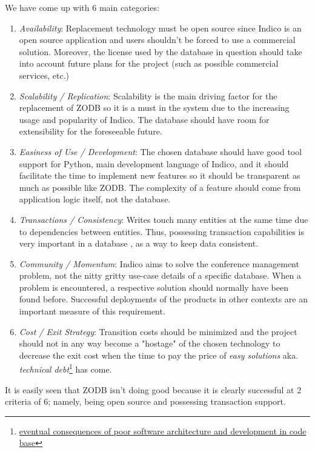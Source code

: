 We have come up with 6 main categories:

\begin{enumerate}
  \item \textit{Availability}: Replacement technology must be open source since Indico is an open source application and users shouldn't be forced to use a commercial solution. Moreover, the license used by the database in question should take into account future plans for the project (such as possible commercial services, etc.)
  \item \textit{Scalability / Replication}: Scalability is the main driving factor for the replacement of \textsc{ZODB} so it is a must in the system due to the increasing usage and popularity of Indico. The database should have room for extensibility for the foreseeable future.
  \item \textit{Easiness of Use / Development}: The chosen database should have good tool support for Python, main development language of Indico, and it should facilitate the time to implement new features so it should be transparent as much as possible like \textsc{ZODB}. The complexity of a feature should come from application logic itself, not the database.
  \item \textit{Transactions / Consistency}: Writes touch many entities at the same time due to dependencies between entities. Thus, possessing transaction capabilities is very important in a database , as a way to keep data consistent.
  \item \textit{Community / Momentum}: Indico aims to solve the conference management problem, not the nitty gritty use-case details of a specific database. When a problem is encountered, a respective solution should normally have been found before. Successful deployments of the products in other contexts are an important measure of this requirement.
  \item \textit{Cost / Exit Strategy}: Transition costs should be minimized and the project should not in any way become a "hostage" of the chosen technology to decrease the exit cost when the time to pay the price of \textit{easy solutions} aka. \textit{technical debt}\footnote{\href{http://en.wikipedia.org/wiki/Technical_debt}{eventual consequences of poor software architecture and development in code base}} has come.\cite{techdebt}\cite{techdebt-2}\cite{techdebt-3}
\end{enumerate}

It is easily seen that \textsc{ZODB} isn't doing good because it is clearly successful at 2 criteria of 6; namely, being open source and possessing transaction support.
